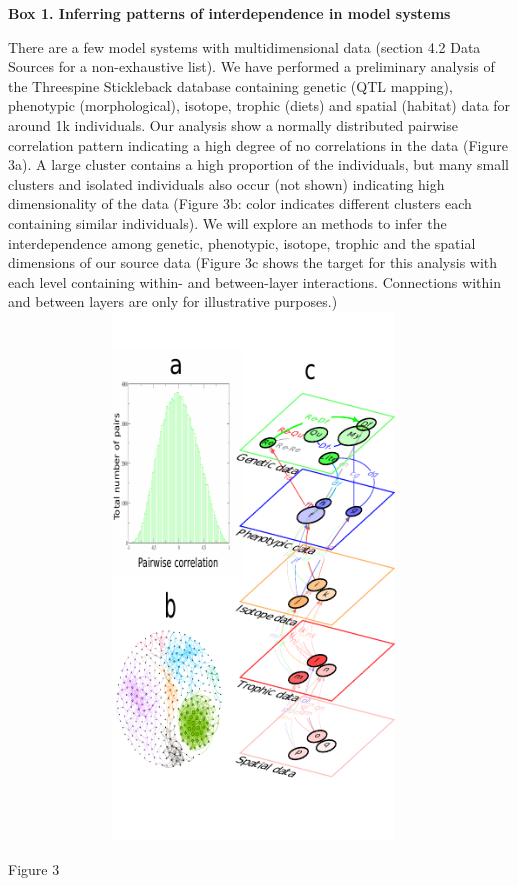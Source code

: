 \documentclass[11pt]{article}
\begin{document}
\begin{mybox}\begin{singlespace}
{\bf{Box 1. Inferring patterns of interdependence in model systems}}\\
\begin{small} 
  There are a few model systems with multidimensional data (section
  4.2 Data Sources for a non-exhaustive list). We have performed a
  preliminary analysis of the Threespine Stickleback database
  containing genetic (QTL mapping), phenotypic (morphological),
  isotope, trophic (diets) and spatial (habitat) data for around 1k
  individuals. Our analysis show a normally distributed pairwise
  correlation pattern indicating a high degree of no correlations in
  the data (Figure 3a). A large cluster contains a high proportion of
  the individuals, but many small clusters and isolated individuals
  also occur (not shown) indicating high dimensionality of the data
  (Figure 3b: color indicates different clusters each containing
  similar individuals). We will explore an methods to infer the
  interdependence among genetic, phenotypic, isotope, trophic and the
  spatial dimensions of our source data
  \citep{Schmidhuber:2015,Bianconi:2018} (Figure 3c shows the target
  for this analysis with each level containing within- and
  between-layer interactions. Connections within and between layers
  are only for illustrative purposes.)
  \vspace{-0.75 in}
  \hspace{0.5 in}\includegraphics[width=13cm,height=14cm]{Figure3.pdf}
  \vspace{0.75 in} \hspace{-3 in}\caption{{\small Figure 3}}
\end{small}
\end{singlespace}
\end{mybox}
\end{document}
